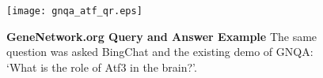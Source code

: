 \begin{figure}[h] %
	\centering
	\texttt{[image: gnqa\_atf\_qr.eps]}
	\caption{ \textbf{GeneNetwork.org Query and Answer Example}
    The same question was asked BingChat and the existing demo of GNQA: `What is the role of Atf3 in the brain?'. 
            }
        \label{fig:gnqa-atf3-qa}
\end{figure}
